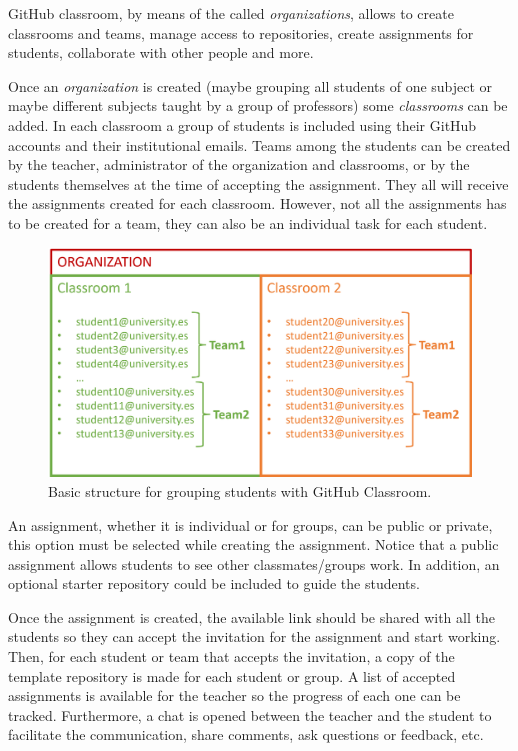 GitHub classroom, by means of the called \textit{organizations}, allows to create classrooms and teams, manage access to repositories, create assignments for students, collaborate with other people and more. 

Once an \textit{organization} is created (maybe grouping all students of one subject or maybe different subjects taught by a group of professors) some \textit{classrooms} can be added. 
In each classroom a group of students is included using their GitHub accounts and their institutional emails.
Teams among the students can be created by the teacher, administrator of the organization and classrooms, or by the students themselves at the time of accepting the assignment. 
They all will receive the assignments created for each classroom.  
However, not all the assignments has to be created for a team, they can also be an individual task for each student. 

\begin{figure}[h]
    \centering
    \includegraphics[width = \textwidth]{Figures/OrgGHClass.png}
    \caption{Basic structure for grouping students with GitHub Classroom.}
    \label{fig:OrgGHClass}
\end{figure} 


An assignment, whether it is individual or for groups, can be public or private, this option must be selected while creating the assignment. 
Notice that a public assignment allows students to see other classmates/groups work. 
In addition, an optional starter repository could be included to guide the students. 

Once the assignment is created, the available link should be shared with all the students so they can accept the invitation for the assignment and start working.  
Then, for each student or team that accepts the invitation, a copy of the template repository is made for each student or group. 
A list of accepted assignments is available for the teacher so the progress of each one can be tracked. Furthermore, a chat is opened between the teacher and the student 
to facilitate the communication, share comments, ask questions or feedback, etc. 















